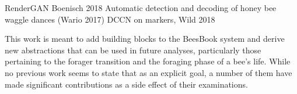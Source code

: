 RenderGAN Boenisch 2018 Automatic detection and decoding of honey bee waggle
dances (Wario 2017) DCCN on markers, Wild 2018

This work is meant to add building blocks to the BeesBook system and derive new
abstractions that can be used in future analyses, particularly those pertaining
to the forager transition and the foraging phase of a bee’s life. While no
previous work seems to state that as an explicit goal, a number of them have
made significant contributions as a side effect of their examinations.
